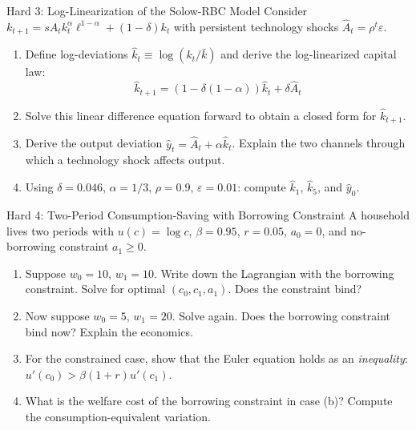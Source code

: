 \documentclass[aspectratio=169,10pt]{beamer}
\newcommand{\apxbutton}[1]{\hfill\hyperlink{#1}{\beamerbutton{Solution}}}
\begin{document}
\begin{frame}{Hard 3: Log-Linearization of the Solow-RBC Model}
\hypertarget{q-h3}{}
Consider $k_{t+1} = sA_tk_t^\alpha\ell^{1-\alpha} + (1-\delta)k_t$ with persistent technology shocks $\hat{A}_t = \rho^t\varepsilon$.

\begin{enumerate}
  \item Define log-deviations $\hat{k}_t \equiv \log(k_t/\bar{k})$ and derive the log-linearized capital law:
  \[
  \hat{k}_{t+1} = (1 - \delta(1-\alpha))\hat{k}_t + \delta\hat{A}_t
  \]
  \item Solve this linear difference equation forward to obtain a closed form for $\hat{k}_{t+1}$.
  \item Derive the output deviation $\hat{y}_t = \hat{A}_t + \alpha\hat{k}_t$. Explain the two channels through which a technology shock affects output.
  \item Using $\delta=0.046$, $\alpha=1/3$, $\rho=0.9$, $\varepsilon=0.01$: compute $\hat{k}_1$, $\hat{k}_5$, and $\hat{y}_0$.
\end{enumerate}
\apxbutton{s-h3}
\end{frame}

\begin{frame}{Hard 4: Two-Period Consumption-Saving with Borrowing Constraint}
\hypertarget{q-h4}{}
A household lives two periods with $u(c)=\log c$, $\beta=0.95$, $r=0.05$, $a_0=0$, and no-borrowing constraint $a_1 \geq 0$.

\begin{enumerate}
  \item Suppose $w_0 = 10$, $w_1 = 10$. Write down the Lagrangian with the borrowing constraint. Solve for optimal $(c_0, c_1, a_1)$. Does the constraint bind?
  \item Now suppose $w_0 = 5$, $w_1 = 20$. Solve again. Does the borrowing constraint bind now? Explain the economics.
  \item For the constrained case, show that the Euler equation holds as an \emph{inequality}: $u'(c_0) > \beta(1+r)u'(c_1)$.
  \item What is the welfare cost of the borrowing constraint in case (b)? Compute the consumption-equivalent variation.
\end{enumerate}
\apxbutton{s-h4}
\end{frame}
\end{document}
